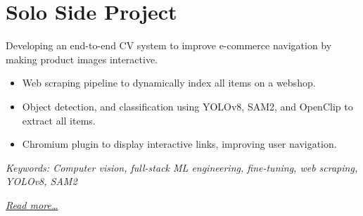 \section{Solo Side Project}
Developing an end-to-end CV system to improve e-commerce navigation by making product images interactive.

\begin{itemize}
  \item Web scraping pipeline to dynamically index all items on a webshop.
  \item Object detection, and classification using YOLOv8, SAM2, and OpenClip to extract all items.
  \item Chromium plugin to display interactive links, improving user navigation.
\end{itemize}

{\footnotesize\textit{Keywords: Computer vision, full-stack ML engineering, fine-tuning, web scraping, YOLOv8, SAM2}}

\hfill{\small{\textit{\hyperref[sec:iris]{Read more…}}}}

